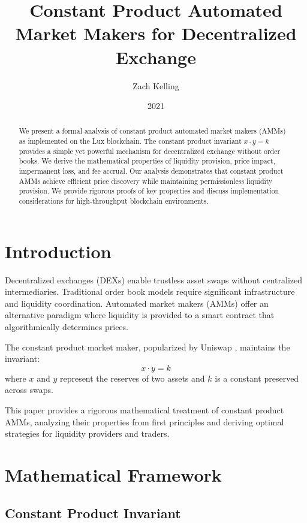 \documentclass[11pt,a4paper]{article}
\title{Constant Product Automated Market Makers for Decentralized Exchange}
\author{Zach Kelling}
\affil{Hanzo Industries \\ Lux Industries \\ Zoo Labs Foundation}
\date{2021}
\theoremstyle{definition}
\begin{document}
\maketitle

\begin{abstract}
We present a formal analysis of constant product automated market makers (AMMs) as implemented on the Lux blockchain. The constant product invariant $x \cdot y = k$ provides a simple yet powerful mechanism for decentralized exchange without order books. We derive the mathematical properties of liquidity provision, price impact, impermanent loss, and fee accrual. Our analysis demonstrates that constant product AMMs achieve efficient price discovery while maintaining permissionless liquidity provision. We provide rigorous proofs of key properties and discuss implementation considerations for high-throughput blockchain environments.
\end{abstract}

\section{Introduction}

Decentralized exchanges (DEXs) enable trustless asset swaps without centralized intermediaries. Traditional order book models require significant infrastructure and liquidity coordination. Automated market makers (AMMs) offer an alternative paradigm where liquidity is provided to a smart contract that algorithmically determines prices.

The constant product market maker, popularized by Uniswap \cite{uniswap}, maintains the invariant:
\begin{equation}
x \cdot y = k
\end{equation}
where $x$ and $y$ represent the reserves of two assets and $k$ is a constant preserved across swaps.

This paper provides a rigorous mathematical treatment of constant product AMMs, analyzing their properties from first principles and deriving optimal strategies for liquidity providers and traders.

\section{Mathematical Framework}

\subsection{Constant Product Invariant}
\end{document}
